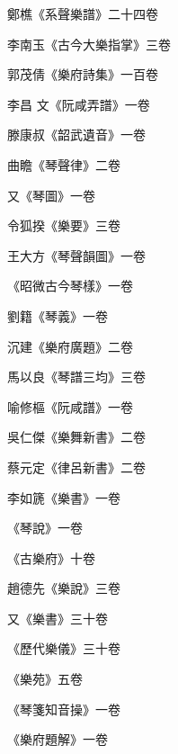 \begin{pinyinscope}
 鄭樵《系聲樂譜》二十四卷



 李南玉《古今大樂指掌》三卷



 郭茂倩《樂府詩集》一百卷



 李昌
 文《阮咸弄譜》一卷



 滕康叔《韶武遺音》一卷



 曲瞻《琴聲律》二卷



 又《琴圖》一卷



 令狐揆《樂要》三卷



 王大方《琴聲韻圖》一卷



 《昭微古今琴樣》一卷



 劉籍《琴義》一卷



 沉建《樂府廣題》二卷



 馬以良《琴譜三均》三卷



 喻修樞《阮咸譜》一卷



 吳仁傑《樂舞新書》二卷



 蔡元定《律呂新書》二卷



 李如篪《樂書》一卷



 《琴說》一卷



 《古樂府》十卷



 趙德先《樂說》三卷



 又《樂書》三十卷



 《歷代樂儀》三十卷



 《樂苑》五卷



 《琴箋知音操》一卷



 《樂府題解》一卷




\end{pinyinscope}
